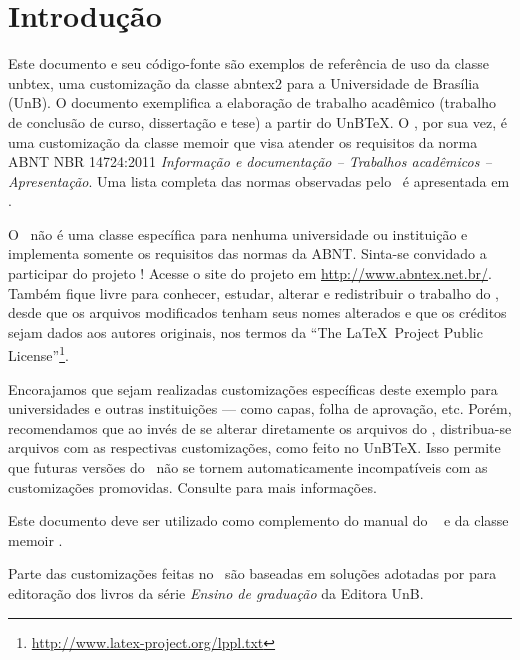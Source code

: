 \chapter{Introdução}
\label{cap_intr}

Este documento e seu código-fonte são exemplos de referência de uso da classe \textsf{unbtex}, uma customização da classe \textsf{abntex2} para a Universidade de Brasília (UnB). O documento exemplifica a elaboração de trabalho acadêmico (trabalho de conclusão de curso, dissertação e tese) a partir do UnB\TeX. O \abnTeX, por sua vez, é uma customização da classe \textsf{memoir} que visa atender os requisitos da norma ABNT NBR 14724:2011 \emph{Informação e documentação -- Trabalhos acadêmicos -- Apresentação}. Uma lista completa das normas observadas pelo \abnTeX\ é apresentada em .


O \abnTeX\ não é uma classe específica para nenhuma universidade ou instituição e implementa somente os requisitos das normas da ABNT. Sinta-se convidado a participar do projeto \abnTeX! Acesse o site do projeto em \url{http://www.abntex.net.br/}. Também fique livre para conhecer, estudar, alterar e redistribuir o trabalho do \abnTeX, desde que os arquivos modificados tenham seus nomes alterados e que os créditos sejam dados aos autores originais, nos termos da ``The \LaTeX\ Project Public License''\footnote{\url{http://www.latex-project.org/lppl.txt}}.

Encorajamos que sejam realizadas customizações específicas deste exemplo para universidades e outras instituições --- como capas, folha de aprovação, etc. Porém, recomendamos que ao invés de se alterar diretamente os arquivos do \abnTeX, distribua-se arquivos com as respectivas customizações, como feito no UnB\TeX. Isso permite que futuras versões do \abnTeX~não se tornem automaticamente incompatíveis com as customizações promovidas. Consulte  para mais informações.

Este documento deve ser utilizado como complemento do manual do \abnTeX\ \cite{abntex2classe} e da classe \textsf{memoir} \cite{memoir}. 

Parte das customizações feitas no \abnTeX\ são baseadas em soluções adotadas por  para editoração dos livros da série \textit{Ensino de graduação} da Editora UnB.

